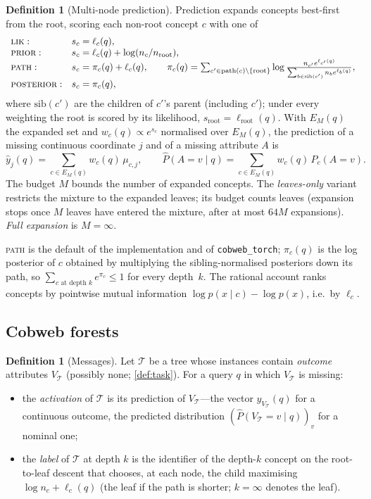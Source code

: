 \documentclass[11pt]{article}
\theoremstyle{definition}
\newtheorem{definition}[theorem]{Definition}
\theoremstyle{remark}
\newcommand{\T}{\mathcal{T}}
\newcommand{\hy}{\hat{y}}
\begin{document}
\begin{definition}[Multi-node prediction]\label{def:predict}
Prediction expands concepts best-first from the root, scoring each non-root concept $c$
with one of
\[
\begin{array}{ll}
\textsc{lik}: & s_c=\ell_c(q),\\
\textsc{prior}: & s_c=\ell_c(q)+\log(n_c/n_{\text{root}}),\\
\textsc{path}: & s_c=\pi_c(q)+\ell_c(q),\qquad
  \pi_c(q)=\sum_{c'\in\text{path}(c)\setminus\{\text{root}\}}
  \log\frac{n_{c'}e^{\ell_{c'}(q)}}{\sum_{b\in\text{sib}(c')}n_b e^{\ell_b(q)}},\\
\textsc{posterior}: & s_c=\pi_c(q),
\end{array}
\]
where $\text{sib}(c')$ are the children of $c'$'s parent (including $c'$); under every
weighting the root is scored by its likelihood, $s_{\text{root}}=\ell_{\text{root}}(q)$.
With $E_M(q)$ the expanded set and $w_c(q)\propto e^{s_c}$ normalised over $E_M(q)$, the
prediction of a missing continuous coordinate $j$ and of a missing attribute $A$ is
\[
  \hy_j(q)=\sum_{c\in E_M(q)}w_c(q)\,\mu_{c,j},\qquad
  \hat P(A{=}v\mid q)=\sum_{c\in E_M(q)}w_c(q)\,P_c(A{=}v).
\]
The budget $M$ bounds the number of expanded concepts.  The \emph{leaves-only} variant
restricts the mixture to the expanded leaves; its budget counts leaves (expansion stops
once $M$ leaves have entered the mixture, after at most $64M$ expansions).  \emph{Full
expansion} is $M=\infty$.
\end{definition}

\textsc{path} is the default of the implementation and of \texttt{cobweb\_torch};
$\pi_c(q)$ is the log posterior of $c$ obtained by multiplying the sibling-normalised
posteriors down its path, so $\sum_{c\text{ at depth }k}e^{\pi_c}\le1$ for every
depth~$k$.  The rational account \citep{maclellan2026rational} ranks concepts by
pointwise mutual information $\log p(x\mid c)-\log p(x)$, i.e.\ by $\ell_c$.

\subsection{Cobweb forests}

\begin{definition}[Messages]\label{def:messages}
Let $\T$ be a tree whose instances contain \emph{outcome} attributes $V_\T$ (possibly
none; \cref{def:task}).  For a query $q$ in which $V_\T$ is missing:
\begin{itemize}[leftmargin=*]
\item the \emph{activation} of $\T$ is its prediction of $V_\T$---the vector
  $\hy_{V_\T}(q)$ for a continuous outcome, the predicted distribution
  $(\hat P(V_\T{=}v\mid q))_v$ for a nominal one;
\item the \emph{label} of $\T$ at depth $k$ is the identifier of the depth-$k$ concept
  on the root-to-leaf descent that chooses, at each node, the child maximising
  $\log n_c+\ell_c(q)$ (the leaf if the path is shorter; $k=\infty$ denotes the leaf).
\end{itemize}
\end{definition}
\end{document}
